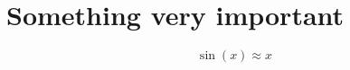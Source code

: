 \setlength{\midchapskip}{20pt}
\renewcommand*{\afterchapternum}{\par\nobreak\vskip \midchapskip} %
\chapter{Something very important}
\label{app:details}

\[
    \sin(x) \approx x
\]

